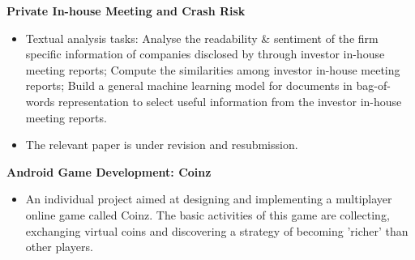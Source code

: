\documentclass[%
               doublesided,
               paper=a4,
               fontsize=11pt
              ]{my-resume}
\begin{document}
\textbf{Private In-house Meeting and Crash Risk}
\begin{itemize}
    \item Textual analysis tasks:  Analyse the readability \& sentiment of the firm specific information of companies disclosed by through investor in-house meeting reports; 
     Compute the similarities among investor in-house meeting reports;
     Build a general machine learning model for documents in bag-of-words representation to select useful information from the investor in-house meeting reports.
    \item The relevant paper is under revision and resubmission.
\end{itemize}
\divider

\textbf{Android Game Development: Coinz}
\smallskip
\begin{itemize}
    \item An individual project aimed at designing and implementing a multiplayer online game called Coinz.   The  basic  activities  of  this  game  are  collecting,  exchanging  virtual  coins  and  discovering  a strategy of becoming ’richer’ than other players.
\end{itemize}
\divider


    

    
\end{document}
